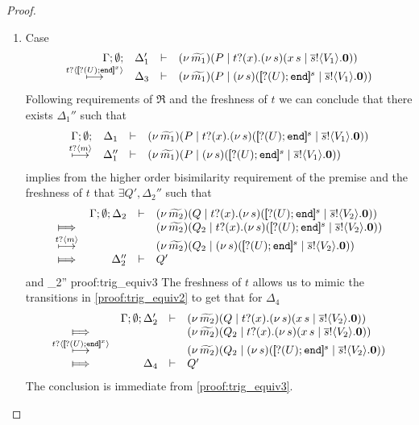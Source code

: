 \begin{proof}
\begin{enumerate}
		\item	{}Case
			\[
				\mhorel{\Gamma}{\Delta_1'}{\newsp{\widetilde{m_1}}{P \Par \hotrigger{t}{x}{s}{V_1}}}
				{\hby{\bactinp{t}{\map{\btinp{U} \tinact}^{x}}}}
				{\Delta_3}{}{\newsp{\widetilde{m_1}}{P \Par \newsp{s}{\map{\btinp{U} \tinact}^{s} \Par \bout{\dual{s}}{V_1} \inact}}}
			\]
				Following requirements of $\Re$ and the freshness of $t$
				we can conclude that there exists $\Delta_1''$ such that
			\[
				\mhorel{\Gamma}{\Delta_1}{\newsp{\widetilde{m_1}}{P \Par \fotrigger{t}{x}{s}{\btinp{U} \tinact}{V_1}}}
				{\hby{\bactinp{t}{m}}}
				{\Delta_1''}{}{\newsp{\widetilde{m_1}}{P \Par \newsp{s}{\map{\btinp{U} \tinact}^{s} \Par \bout{\dual{s}}{V_1} \inact}}}
			\]
				implies from the higher order bisimilarity requirement of the premise  and
				the freshness of $t$ that $\exists Q', \Delta_2''$ such that
				\begin{eqnarray}
					\begin{array}{crll}
						& \Gamma; \es; \Delta_2 & \proves &		
						\newsp{\widetilde{m_2}}{Q \Par \fotrigger{t}{x}{s}{\btinp{U} \tinact}{V_2}}
						\\
						\Hby{} &&&
						\newsp{\widetilde{m_2}}{Q_2 \Par \fotrigger{t}{x}{s}{\btinp{U} \tinact}{V_2}}
						\\
						{\hby{\bactinp{t}{m}}}& & &
						\newsp{\widetilde{m_2}}{Q_2 \Par \newsp{s}{\map{\btinp{U} \tinact}^{s} \Par \bout{\dual{s}}{V_2} \inact}}
						\\
						\Hby{} & \Delta_2'' & \proves & Q'
					\end{array}
					\label{proof:trig_equiv2}
				\end{eqnarray}
				and
				{\fwb}
				{\Delta_2''}{}
				{proof:trig_equiv3}
				The freshness of $t$ allows us to mimic the transitions
				in \eqref{proof:trig_equiv2} to get that for $\Delta_4$
				\begin{eqnarray*}
					\begin{array}{crll}
						& \Gamma; \es; \Delta_2' & \proves &		
						\newsp{\widetilde{m_2}}{Q \Par \hotrigger{t}{x}{s}{V_2}}
						\\
						\Hby{} &&&
						\newsp{\widetilde{m_2}}{Q_2 \Par \hotrigger{t}{x}{s}{V_2}}
						\\
						{\hby{\bactinp{t}{\map{\btinp{U} \tinact}^{x}}}}& & &
						\newsp{\widetilde{m_2}}{Q_2 \Par \newsp{s}{\map{\btinp{U} \tinact}^{s} \Par \bout{\dual{s}}{V_2} \inact}}
						\\
						\Hby{} & \Delta_4 & \proves & Q'
					\end{array}
				\end{eqnarray*}
				The conclusion is immediate from \eqref{proof:trig_equiv3}.


\end{enumerate}
\end{proof}
